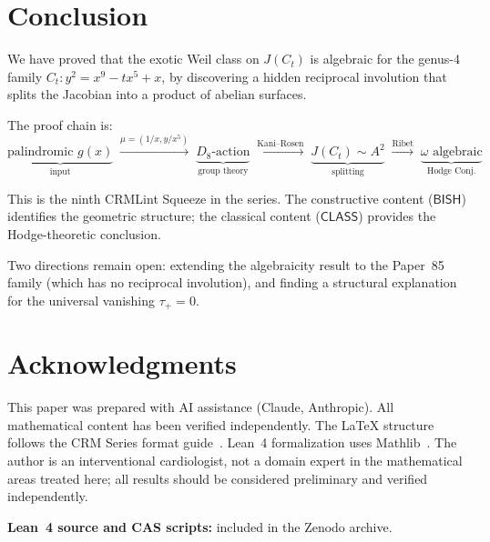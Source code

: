 \documentclass[11pt]{article}
\theoremstyle{plain}
\theoremstyle{definition}
\theoremstyle{remark}
\newcommand{\BISH}{\ensuremath{\mathsf{BISH}}}
\newcommand{\CLASS}{\ensuremath{\mathsf{CLASS}}}
\begin{document}
\section{Conclusion}
\label{sec:conclusion}

We have proved that the exotic Weil class on $J(C_t)$ is algebraic
for the genus-4 family $C_t\colon y^2 = x^9 - tx^5 + x$, by
discovering a hidden reciprocal involution that splits the Jacobian
into a product of abelian surfaces.

The proof chain is:
\[
  \underbrace{\text{palindromic } g(x)}_{\text{input}}
  \;\xrightarrow{\mu = (1/x, y/x^5)}\;
  \underbrace{D_8\text{-action}}_{\text{group theory}}
  \;\xrightarrow{\text{Kani--Rosen}}\;
  \underbrace{J(C_t) \sim A^2}_{\text{splitting}}
  \;\xrightarrow{\text{Ribet}}\;
  \underbrace{\omega \text{ algebraic}}_{\text{Hodge Conj.}}
\]

This is the ninth CRMLint Squeeze in the series.  The constructive
content (\BISH) identifies the geometric structure; the classical
content (\CLASS) provides the Hodge-theoretic conclusion.

Two directions remain open: extending the algebraicity result to the
Paper~85 family (which has no reciprocal involution), and finding a
structural explanation for the universal vanishing $\tau_+ = 0$.

\section*{Acknowledgments}

This paper was prepared with AI assistance (Claude, Anthropic).
All mathematical content has been verified independently.
The LaTeX structure follows the CRM Series format
guide~\cite{FormatGuide}.
Lean~4 formalization uses Mathlib~\cite{Mathlib}.
The author is an interventional cardiologist, not a domain expert in the mathematical areas treated here; all results should be considered preliminary and verified independently.

\medskip\noindent
\textbf{Lean~4 source and CAS scripts:} included in the Zenodo archive.
\end{document}
